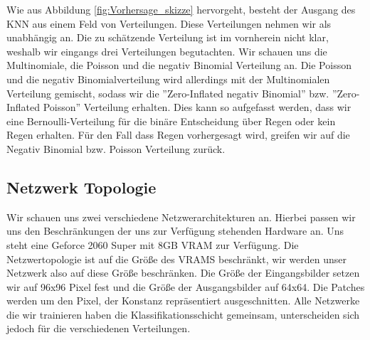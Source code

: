 \noindent Wie aus Abbildung \ref{fig:Vorhersage_skizze} hervorgeht, besteht der Ausgang des KNN aus einem Feld von Verteilungen. Diese Verteilungen nehmen wir als unabhängig an.
Die zu schätzende Verteilung ist im vornherein nicht klar, weshalb wir eingangs drei Verteilungen begutachten.
Wir schauen uns die Multinomiale, die Poisson und die negativ Binomial Verteilung an.
Die Poisson und die negativ Binomialverteilung wird allerdings mit der Multinomialen Verteilung gemischt, sodass wir die ''Zero-Inflated negativ Binomial'' bzw. ''Zero-Inflated Poisson'' Verteilung erhalten.
Dies kann so aufgefasst werden, dass wir eine Bernoulli-Verteilung für die binäre Entscheidung über Regen oder kein Regen erhalten. Für den Fall dass Regen vorhergesagt wird, greifen wir auf die Negativ Binomial bzw. Poisson Verteilung zurück.
\\

\subsection{Netzwerk Topologie}

\noindent Wir schauen uns zwei verschiedene Netzwerarchitekturen an. Hierbei passen wir uns den Beschränkungen der uns zur Verfügung stehenden Hardware an.
Uns steht eine Geforce 2060 Super mit 8GB VRAM zur Verfügung. Die Netzwertopologie ist auf die Größe des VRAMS beschränkt, wir werden unser Netzwerk also auf diese Größe beschränken. Die Größe der Eingangsbilder setzen wir auf 96x96 Pixel fest und die Größe der Ausgangsbilder auf 64x64. Die Patches werden um den Pixel, der Konstanz repräsentiert ausgeschnitten.
Alle Netzwerke die wir trainieren haben die Klassifikationsschicht gemeinsam, unterscheiden sich jedoch für die verschiedenen Verteilungen.\\

